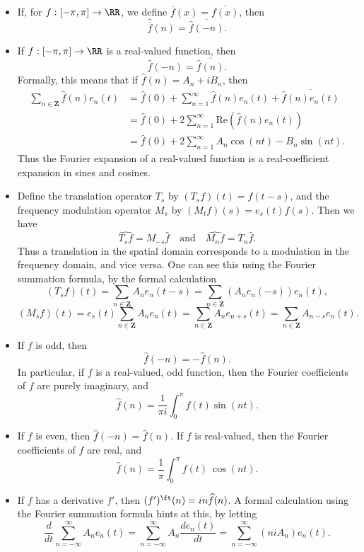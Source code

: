 \begin{itemize}
    \item If, for $f: [-\pi,\pi] \to \RR$, we define $\overline{f}(x) = \overline{f(x)}$, then
    \[ \widehat{\overline{f}}(n) = \overline{\widehat{f}(-n)}. \]

    \item If $f: [-\pi,\pi] \to \RR$ is a real-valued function, then
    \[ \widehat{f}(-n) = \overline{\widehat{f}(n)}. \]
    Formally, this means that if $\widehat{f}(n) = A_n + i B_n$, then
    \begin{align*}
    	\sum_{n \in \mathbf{Z}} \widehat{f}(n) e_n(t) &= \widehat{f}(0) + \sum_{n = 1}^\infty \widehat{f}(n) e_n(t) + \overline{\widehat{f}(n) e_n(t)}\\
    	&= \widehat{f}(0) + 2 \sum_{n = 1}^\infty \text{Re}(\widehat{f}(n) e_n(t))\\
    	&= \widehat{f}(0) + 2 \sum_{n = 1}^\infty A_n \cos(nt) - B_n \sin(nt).
    \end{align*}
    Thus the Fourier expansion of a real-valued function is a real-coefficient expansion in sines and cosines.

    \item Define the translation operator $T_s$ by $(T_s f)(t) = f(t-s)$, and the frequency modulation operator $M_s$ by $(M_t f)(s) = e_s(t) f(s)$. Then we have
    \[ \widehat{T_s f} = M_{-s} \widehat{f} \quad\text{and}\quad \widehat{M_n f} = T_n \widehat{f}. \]
    Thus a translation in the spatial domain corresponds to a modulation in the frequency domain, and vice versa. One can see this using the Fourier summation formula, by the formal calculation
    \[ (T_s f)(t) = \sum_{n \in \mathbf{Z}} A_n e_n(t-s) = \sum_{n \in \mathbf{Z}} (A_n e_n(-s)) e_n(t), \]
    \[ (M_s f)(t) = e_s(t) \sum_{n \in \mathbf{Z}} A_n e_n(t) = \sum_{n \in \mathbf{Z}} A_n e_{n+s}(t) = \sum_{n \in \mathbf{Z}} A_{n - s} e_n(t). \]

    \item If $f$ is odd, then
    \[ \widehat{f}(-n) = -\widehat{f}(n). \]
    In particular, if $f$ is a real-valued, odd function, then the Fourier coefficients of $f$ are purely imaginary, and
    \[ \widehat{f}(n) = \frac{1}{\pi i} \int_0^\pi f(t) \sin(nt). \]

    \item If $f$ is even, then $\widehat{f}(-n) = \widehat{f}(n)$. If $f$ is real-valued, then the Fourier coefficients of $f$ are real, and
    \[ \widehat{f}(n) = \frac{1}{\pi} \int_0^\pi f(t)\ \cos(nt). \]

    \item If $f$ has a derivative $f'$, then $(f')^\ft(n) = in \widehat{f}(n)$. A formal calculation using the Fourier summation formula hints at this, by letting
    \[ \frac{d}{dt} \sum_{n = -\infty}^\infty A_n e_n(t) = \sum_{n = -\infty}^\infty A_n \frac{de_n(t)}{dt} = \sum_{n = -\infty}^\infty (ni A_n) e_n(t). \]
\end{itemize}


